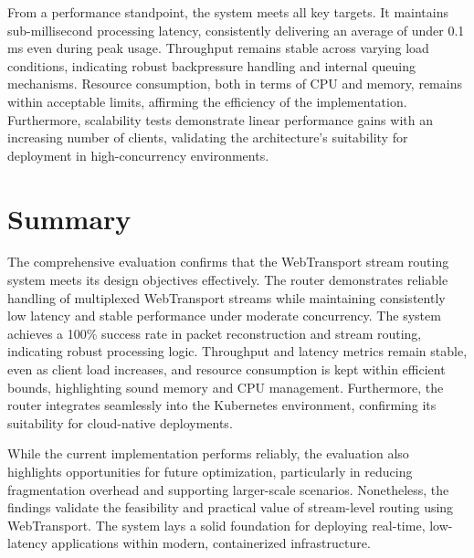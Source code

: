 From a performance standpoint, the system meets all key targets. It maintains sub-millisecond processing latency, consistently delivering an average of under 0.1 ms even during peak usage. Throughput remains stable across varying load conditions, indicating robust backpressure handling and internal queuing mechanisms. Resource consumption, both in terms of CPU and memory, remains within acceptable limits, affirming the efficiency of the implementation. Furthermore, scalability tests demonstrate linear performance gains with an increasing number of clients, validating the architecture's suitability for deployment in high-concurrency environments.


\section{Summary}

The comprehensive evaluation confirms that the WebTransport stream routing system meets its design objectives effectively. The router demonstrates reliable handling of multiplexed WebTransport streams while maintaining consistently low latency and stable performance under moderate concurrency. The system achieves a 100\% success rate in packet reconstruction and stream routing, indicating robust processing logic. Throughput and latency metrics remain stable, even as client load increases, and resource consumption is kept within efficient bounds, highlighting sound memory and CPU management. Furthermore, the router integrates seamlessly into the Kubernetes environment, confirming its suitability for cloud-native deployments.

While the current implementation performs reliably, the evaluation also highlights opportunities for future optimization, particularly in reducing fragmentation overhead and supporting larger-scale scenarios. Nonetheless, the findings validate the feasibility and practical value of stream-level routing using WebTransport. The system lays a solid foundation for deploying real-time, low-latency applications within modern, containerized infrastructure.